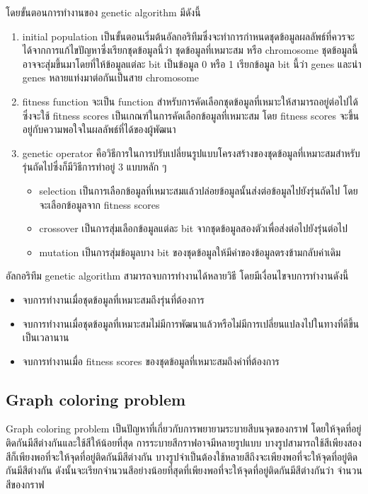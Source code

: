 โดยขั้นตอนการทำงานของ genetic algorithm มีดังนี้ 
\begin{enumerate}
  \item initial population เป็นขั้นตอนเริ่มต้นอัลกอริทึมซึ่งจะทำการกำหนดชุดข้อมูลผลลัพธ์ที่ควรจะได้จากการแก้ไขปัญหาซึ่งเรียกชุดข้อมูลนี้ว่า ชุดข้อมูลที่เหมาะสม หรือ chromosome ชุดข้อมูลนี้อาจจะสุ่มขึ้นมาโดยที่ให้ข้อมูลแต่ละ bit เป็นข้อมูล 0 หรือ 1 เรียกข้อมูล bit นี้ว่า genes และนำ genes หลายแท่งมาต่อกันเป็นสาย chromosome 
  \item fitness function จะเป็น function สำหรับการคัดเลือกชุดข้อมูลที่เหมาะให้สามารถอยู่ต่อไปได้ซึ่งจะใช้ fitness scores เป็นเกณฑ์ในการคัดเลือกข้อมูลที่เหมาะสม
  โดย fitness scores จะขึ้นอยู่กับความพอใจในผลลัพธ์ที่ได้ของผู้พัฒนา
  \item genetic operator คือวิธีการในการปรับเปลี่ยนรูปแบบโครงสร้างของชุดข้อมูลที่เหมาะสมสำหรับรุ่นถัดไปซึ่งก็มีวิธีการทำอยู่ 3 แบบหลัก ๆ 
  \begin{itemize}
  \item selection เป็นการเลือกข้อมูลที่เหมาะสมแล้วปล่อยข้อมูลนั้นส่งต่อข้อมูลไปยังรุ่นถัดไป โดยจะเลือกข้อมูลจาก fitness scores
  \item crossover เป็นการสุ่มเลือกข้อมูลแต่ละ bit จากชุดข้อมูลสองตัวเพื่อส่งต่อไปยังรุ่นต่อไป
  \item mutation เป็นการสุ่มข้อมูลบาง bit ของชุดข้อมูลให้มีค่าของข้อมูลตรงข้ามกลับค่าเดิม
\end{itemize}
\end{enumerate}
อัลกอริทึม genetic algorithm สามารถจบการทำงานได้หลายวิธี โดยมีเงื่อนไขจบการทำงานดังนี้
\begin{itemize}
  \item จบการทำงานเมื่อชุดข้อมูลที่เหมาะสมถึงรุ่นที่ต้องการ 
  \item จบการทำงานเมื่อชุดข้อมูลที่เหมาะสมไม่มีการพัฒนาแล้วหรือไม่มีการเปลี่ยนแปลงไปในทางที่ดีขึ้นเป็นเวลานาน
  \item จบการทำงานเมื่อ fitness scores ของชุดข้อมูลที่เหมาะสมถึงค่าที่ต้องการ
\end{itemize}
\subsection{Graph coloring problem}
Graph coloring problem เป็นปัญหาที่เกี่ยวกับการพยายามระบายสีบนจุดของกราฟ โดยให้จุดที่อยู่ติดกันมีสีต่างกันและใช้สีให้น้อยที่สุด
การระบายสีกราฟอาจมีหลายรูปแบบ บางรูปสามารถใช้สีเพียงสองสีก็เพียงพอที่จะให้จุดที่อยู่ติดกันมีสีต่างกัน บางรูปจำเป็นต้องใช้หลายสีถึงจะเพียงพอที่จะให้จุดที่อยู่ติดกันมีสีต่างกัน 
ดังนั้นจะเรียกจำนวนสีอย่างน้อยที่สุดที่เพียงพอที่จะให้จุดที่อยู่ติดกันมีสีต่างกันว่า จำนวนสีของกราฟ
